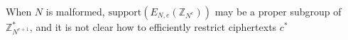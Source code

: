 \documentclass{article}
\newcommand{\encr}[2]{E_{#1}(#2)}
\newcommand{\encdj}{{E}_{N,e}}
\newcommand{\support}{{\mathrm{support}}}
\newcommand{\plain}{{{M}}}
\newcommand{\plaintext}[1]{\plain_{#1}}
\newcommand{\fnrngdom}[2]{#1\to#2}
\newcommand{\fndef}[3]{{#1\,:\,\fnrngdom{#2}{#3}}}
\newcommand{\Z}{{\mathbb{Z}}}
\newcommand{\usamp}[2]{#1\stackrel{R}{\leftarrow}#2}
\newcommand{\U}[1]{\mathbb{Z}_{#1}^*}
\begin{document}
When $N$ is malformed, $\support(\encdj(\Z_{N^e}))$ may be a proper
subgroup of $\U{N^{e+1}}$,
and it is not clear how to efficiently restrict ciphertexts $c^*$
\end{document}
